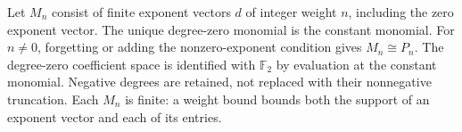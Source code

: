 \begin{definition}
  \label{def:h6-full-milnor-monomials}
  \leanok
  Let $M_n$ consist of finite exponent vectors $d$ of integer weight $n$,
  including the zero exponent vector. The unique degree-zero monomial
  is the constant monomial. For $n\ne0$, forgetting or adding the
  nonzero-exponent condition gives $M_n\cong P_n$.
  The degree-zero coefficient space is identified with $\mathbb F_2$
  by evaluation at the constant monomial. Negative degrees are retained,
  not replaced with their nonnegative truncation.
  Each $M_n$ is finite: a weight bound bounds both the support of an
  exponent vector and each of its entries.
\end{definition}

